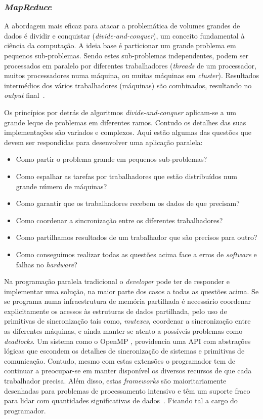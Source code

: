\subsubsection{\textit{\textit{MapReduce}}}
\label{mapreduce_framework}
A abordagem mais eficaz para atacar a problemática de volumes grandes de dados é dividir e conquistar (\textit{divide-and-conquer}), um conceito fundamental à ciência da computação. A ideia base é particionar um grande problema em pequenos sub-problemas. Sendo estes sub-problemas independentes, podem ser processados em paralelo por diferentes trabalhadores (\textit{threads} de um processador, muitos processadores numa máquina, ou muitas máquinas em \textit{cluster}). Resultados intermédios dos vários trabalhadores (máquinas) são combinados, resultando no \textit{output} final~\cite{lin2010data}.

Os princípios por detrás de algoritmos \textit{divide-and-conquer} aplicam-se a um grande leque de problemas em diferentes ramos. Contudo os detalhes das suas implementações são variados e complexos. Aqui estão algumas das questões que devem ser respondidas para desenvolver uma aplicação paralela:
\begin{itemize}
    \item Como partir o problema grande em pequenos sub-problemas?
    \item Como espalhar as tarefas por trabalhadores que estão distribuídos num grande número de máquinas?
    \item Como garantir que os trabalhadores recebem os dados de que precisam?
    \item Como coordenar a sincronização entre os diferentes trabalhadores?
    \item Como partilhamos resultados de um trabalhador que são precisos para outro?
    \item Como conseguimos realizar todas as questões acima face a erros de \textit{software} e falhas no \textit{hardware}?
\end{itemize}
Na programação paralela tradicional o \textit{developer} pode ter de responder e implementar uma solução, na maior parte dos casos a todas as questões acima. Se se programa numa infraestrutura de memória partilhada é necessário coordenar explicitamente os acessos às estruturas de dados partilhada, pelo uso de primitivas de sincronização tais como, \textit{mutexes}, coordenar a sincronização entre as diferentes máquinas, e ainda manter-se atento a possíveis problemas como \textit{deadlocks}. Um sistema como o OpenMP , providencia uma API com abstrações lógicas que escondem os detalhes de sincronização de sistemas e primitivas de comunicação. Contudo, mesmo com estas extensões o programador tem de continuar a preocupar-se em manter disponível os diversos recursos de que cada trabalhador precisa. Além disso, estas \textit{frameworks} são maioritariamente desenhadas para problemas de processamento intensivo e têm um suporte fraco para lidar com quantidades significativas de dados~\cite{lin2010data}. Ficando tal a cargo do programador.

